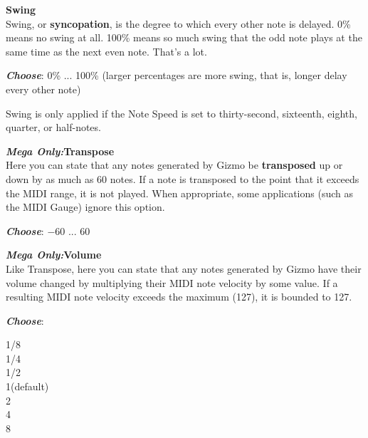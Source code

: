 \documentclass{article}
\begin{document}
\begin{description}
	\item{\bf Swing}\\
			Swing, or {\bf syncopation}, is the degree to which every other note is delayed.  0\% means no swing at all.  100\% means so much swing that the odd note plays at the same time as the next even note.  That's a lot.
		\begin{description}
		\item{\bf \textit{Choose}}: 0\% ... 100\% (larger percentages are more swing, that is, longer delay every other note)
		\end{description}

		Swing is only applied if the Note Speed is set to thirty-second, sixteenth, eighth, quarter, or half-notes.

	\item{\bf \textit{Mega Only:}\quad Transpose}\\
		Here you can state that any notes generated by Gizmo be {\bf transposed} up or down by as much as 60 notes. If a note is transposed to the point that it exceeds the MIDI range, it is not played.  When appropriate, some applications (such as the MIDI Gauge) ignore this option. 
		\begin{description}
		\item{\bf \textit{Choose}}: \(-60\) ... 60 
		\end{description}

	\item{\bf \textit{Mega Only:}\quad Volume}\\
		Like Transpose, here you can state that any notes generated by Gizmo have their volume changed by multiplying their MIDI note velocity by some value.  If a resulting MIDI note velocity exceeds the maximum (127), it is bounded to 127.
			
			
			\begin{description}
			\item{\bf \textit{Choose}}:
			\begin{tabbing}
			1/8\\
			1/4\\
			1/2\hspace{3.65in}\\
			1\qquad (default)\\
			2\\
			4\\
			8
			\end{tabbing}
		\end{description}


\end{description}
\end{document}
